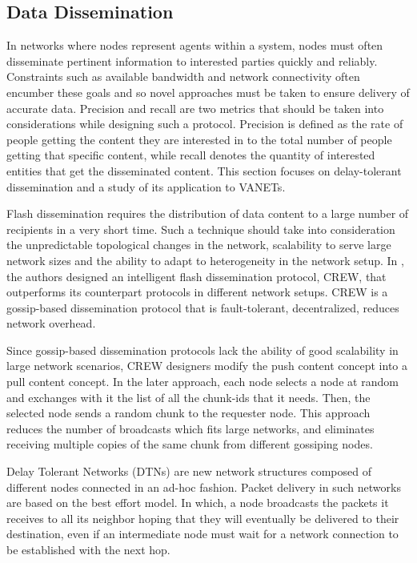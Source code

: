 \documentclass{IEEEtran}
\begin{document}
\subsection{Data Dissemination}

In networks where nodes represent agents within a system, nodes must often disseminate pertinent information to interested parties quickly and reliably.  Constraints such as available bandwidth and network connectivity often encumber these goals and so novel approaches must be taken to ensure delivery of accurate data.
Precision and recall are two metrics that should be taken into considerations while designing such a protocol. Precision is defined as the rate of people getting the content they are interested in to the total number of people getting that specific content, while recall denotes the quantity of interested entities that get the disseminated content.  This section focuses on delay-tolerant dissemination and a study of its application to VANETs.

Flash dissemination requires the distribution of data content to a large number of recipients in a very short time. Such a technique should take into consideration the unpredictable topological changes in the network, scalability to serve large network sizes and the ability to adapt to heterogeneity in the network setup.
In \cite{crew}, the authors designed an intelligent flash dissemination protocol, CREW, that outperforms its counterpart protocols in different network setups. CREW is a gossip-based dissemination protocol that is fault-tolerant, decentralized, reduces network overhead.

Since gossip-based dissemination protocols lack the ability of good scalability in large network scenarios, CREW designers modify the push content concept into a pull content concept. In the later approach, each node selects a node at random and exchanges with it the list of all the chunk-ids that it needs.
Then, the selected node sends a random chunk to the requester node. This approach reduces the number of broadcasts which fits large networks, and eliminates receiving multiple copies of the same chunk from different gossiping nodes.

Delay Tolerant Networks (DTNs) are new network structures composed of different nodes connected in an ad-hoc fashion. Packet delivery in such networks are based on the best effort model. In which, a node broadcasts the packets it receives to all its neighbor hoping that they will eventually be delivered to their destination, even if an intermediate node must wait for a network connection to be established with the next hop.
\end{document}
